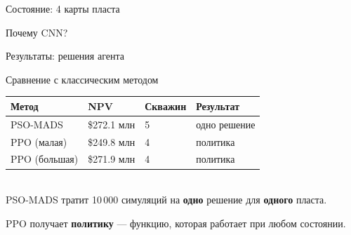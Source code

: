 \documentclass[aspectratio=169,12pt,t,compress]{beamer}
\begin{document}
\begin{frame}{Состояние: 4 карты пласта}
\end{frame}

\begin{frame}{Почему CNN?}
\end{frame}



\begin{frame}{Результаты: решения агента}
\end{frame}

\begin{frame}{Сравнение с классическим методом}
	\centering
	\begin{tabular}{|p{3.5cm}|p{3cm}|p{3cm}|p{2.5cm}|}
		\hline
		\textbf{Метод} & \textbf{NPV} & \textbf{Скважин} & \textbf{Результат} \\
		\hline
		PSO-MADS       & \$272.1 млн  & 5                & одно решение       \\
		\hline
		PPO (малая)    & \$249.8 млн  & 4                & политика           \\
		\hline
		PPO (большая)  & \$271.9 млн  & 4                & политика           \\
		\hline
	\end{tabular}

	\\ [1em]

	PSO-MADS тратит 10\,000 симуляций на \textbf{одно} решение для \textbf{одного} пласта.

	PPO получает \textbf{политику} --- функцию, которая работает при любом состоянии.
\end{frame}
\end{document}

